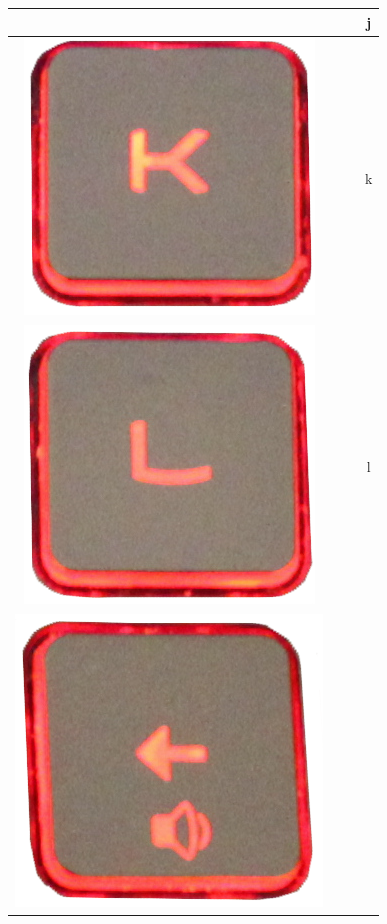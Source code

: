 \begin{longtable}{cccc}
\begin{minipage}[c]{.3\textwidth}
\vspace{0.2cm}
\end{minipage} & & & j\\
\hline
\begin{minipage}[c]{.3\textwidth}
\vspace{0.2cm}
\includegraphics[scale=0.1]{Images/KeyMapping/k}
\vspace{0.2cm}
\end{minipage} & & & k\\
\hline
\begin{minipage}[c]{.3\textwidth}
\vspace{0.2cm}
\includegraphics[scale=0.1]{Images/KeyMapping/l}
\vspace{0.2cm}
\end{minipage} & & & l\\
\hline
\begin{minipage}[c]{.3\textwidth}
\vspace{0.2cm}
\includegraphics[scale=0.1]{Images/KeyMapping/LEFT}

\end{minipage}
\end{longtable}
